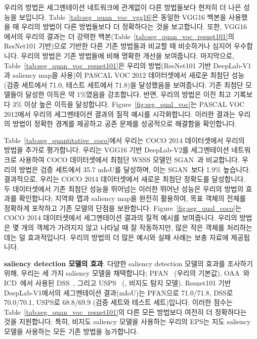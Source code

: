 \documentclass[final]{cvpr}
\begin{document}

우리의 방법은 세그멘테이션 네트워크에 관계없이 다른 방법들보다 현저히 더 나은 성능을 보입니다. Table~\ref{tab:seg_quan_voc_vgg16}은 동일한 VGG16 백본을 사용했을 때 우리의 방법이 다른 방법들보다 더 정확하다는 것을 보고합니다. 또한, VGG16에서의 우리의 결과는 더 강력한 백본(\ie Table~\ref{tab:seg_quan_voc_resnet101}의 ResNet101 기반)으로 기반한 다른 기존 방법들과 비교할 때 비슷하거나 심지어 우수합니다. 우리의 방법은 기존 방법들에 비해 명확한 개선을 보여줍니다. 마지막으로, Table~\ref{tab:seg_quan_voc_resnet101}은 우리의 방법(ResNet101 기반 DeepLab-V1과 saliency map을 사용)이 PASCAL VOC 2012 데이터셋에서 새로운 최첨단 성능(검증 세트에서 71.0, 테스트 세트에서 71.8)을 달성했음을 보여줍니다. 기존 최첨단 모델들이 달성한 이득은 약 1\%였음을 강조합니다. 반면, 우리의 방법은 이전 최고 기록보다 3\% 이상 높은 이득을 달성합니다. Figure~\ref{fig:seg_qual_voc}는 PASCAL VOC 2012에서 우리의 세그멘테이션 결과의 질적 예시를 시각화합니다. 이러한 결과는 우리의 방법이 정확한 경계를 제공하고 공존 문제를 성공적으로 해결함을 확인합니다.

Table~\ref{tab:seg_quantitative_coco}에서 우리는 COCO 2014 데이터셋에서 우리의 방법을 추가로 평가합니다. 우리는 VGG16 기반 DeepLab-V2를 세그멘테이션 네트워크로 사용하여 COCO 데이터셋에서 최첨단 WSSS 모델인 SGAN~\cite{yao2020saliency}과 비교합니다. 우리의 방법은 검증 세트에서 35.7 mIoU를 달성하며, 이는 SGAN~\cite{yao2020saliency}보다 1.9\% 높습니다. 결과적으로, 우리는 COCO 2014 데이터셋에서 새로운 최첨단 정확도를 달성합니다. 두 데이터셋에서 기존 최첨단 성능을 뛰어넘는 이러한 뛰어난 성능은 우리의 방법의 효과를 확인합니다; 지역화 맵과 saliency map을 완전히 활용하여, 목표 객체의 전체를 정확하게 포착하고 기존 모델의 단점을 보완합니다. Figure~\ref{fig:seg_qual_coco}는 COCO 2014 데이터셋에서 세그멘테이션 결과의 질적 예시를 보여줍니다. 우리의 방법은 몇 개의 객체가 가려지지 않고 나타날 때 잘 작동하지만, 많은 작은 객체를 처리하는 데는 덜 효과적입니다. 우리의 방법의 더 많은 예시와 실패 사례는 보충 자료에 제공됩니다.

\vspace{1mm}
\noindent \textbf{saliency detection 모델의 효과}. 다양한 saliency detection 모델의 효과를 조사하기 위해, 우리는 세 가지 saliency 모델을 채택합니다; PFAN~\cite{zhao2019pyramid} (우리의 기본값), OAA~\cite{jiang2019integral}와 ICD~\cite{fan2020learning}에서 사용된 DSS~\cite{hou2017deeply}, 그리고 USPS~\cite{nguyen2019deepusps} (\ie, 비지도 탐지 모델). Resnet101 기반 DeepLab-V1에서의 세그멘테이션 결과(mIoU)는 PFAN으로 71.0/71.8, DSS로 70.0/70.1, USPS로 68.8/69.9 (검증 세트와 테스트 세트)입니다. 이러한 점수는 Table~\ref{tab:seg_quan_voc_resnet101}의 다른 모든 방법보다 여전히 더 정확하다는 것을 지원합니다. 특히, 비지도 saliency 모델을 사용하는 우리의 EPS는 지도 saliency 모델을 사용하는 모든 기존 방법을 능가합니다.
\end{document}
